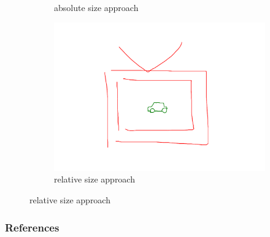 \documentclass{beamer}
\begin{document}
\begin{frame}
\begin{figure}[ht]
\begin{subfigure}{0.35\textwidth}
            \caption*{absolute size approach}
        \end{subfigure}
        \begin{subfigure}{0.35\textwidth}
            \centering
            \includegraphics[width=\textwidth]{figures/car_on_tv_rel.pdf}
            \caption*{relative size approach}
        \end{subfigure}
    \end{figure}
\end{frame}

\begin{frame}
    \frametitle{References}
    
\end{frame}
\end{document}
